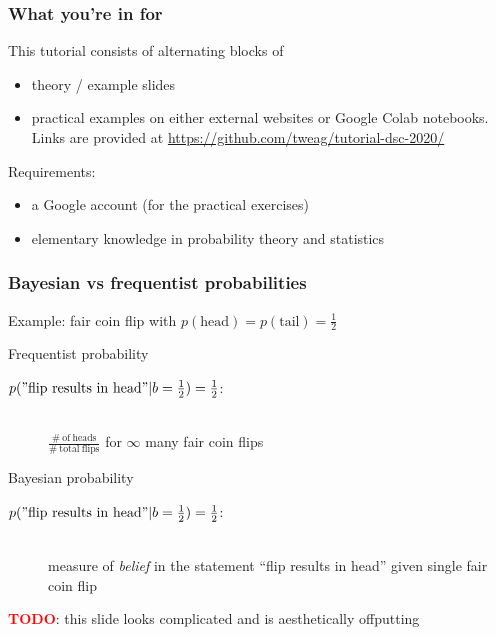 \documentclass[t, aspectratio=169]{beamer}
\newcommand{\todo}{\textcolor{red}{\textbf{TODO}}}
\begin{document}
\begin{frame}
  \frametitle{What you're in for}
  This tutorial consists of alternating blocks of
  \begin{itemize}
  \item theory / example slides
  \item practical examples on either external websites or Google Colab notebooks. Links are provided at {\centering \url{https://github.com/tweag/tutorial-dsc-2020/}}
  \end{itemize}

  Requirements:
  \begin{itemize}
  \item a Google account (for the practical exercises)
  \item elementary knowledge in probability theory and statistics
  \end{itemize}
\end{frame}


\begin{frame}
  \frametitle{Bayesian vs frequentist probabilities}
  Example: fair coin flip with $p(\mathrm{head}) = p(\mathrm{tail}) = \frac{1}{2}$
  \begin{block}{Frequentist probability}
    \begin{description}
    \item[$p(\mathrm{"flip\ results\ in\ head"}|b=\frac{1}{2})=\frac{1}{2}$:] \hfill \\ $\frac{\mathrm{\# \ of \ heads}}{\mathrm{\# \ total \ flips}}$ for $\infty$ many fair coin flips
    \end{description}
  \end{block}
  \begin{block}{Bayesian probability}
    \begin{description}
    \item[$p(\mathrm{"flip\ results\ in\ head"}|b=\frac{1}{2})=\frac{1}{2}$:] \hfill \\ measure of \textit{belief} in the statement ``flip results in head'' given single fair coin flip
    \end{description}
  \end{block}
  \todo: this slide looks complicated and is aesthetically offputting
\end{frame}
\end{document}
